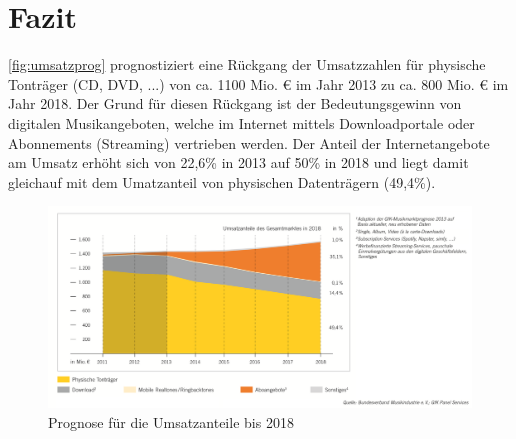 \section{Fazit}
\label{sec:schluss}

\autoref{fig:umsatzprog} prognostiziert eine Rückgang der Umsatzzahlen für
physische Tonträger (CD, DVD, ...) von ca. 1100 Mio. \euro{} im Jahr 2013 zu ca.
800 Mio. \euro{} im Jahr 2018. Der Grund für diesen Rückgang ist der
Bedeutungsgewinn von digitalen Musikangeboten, welche im Internet mittels
Downloadportale oder Abon­ne­ments (Streaming) vertrieben werden. Der Anteil der
Internetangebote am Umsatz erhöht sich von 22,6\% in 2013 auf 50\% in 2018 und
liegt damit gleichauf mit dem Umatzanteil von physischen Datenträgern (49,4\%).

\begin{figure}[h]
    \begin{center}
        \begin{minipage}[t]{\textwidth}
            \begin{center}
                \includegraphics[width=\textwidth]{Bilder/Schluss/prognose.png}
                \caption[Prognose für die Umsatzanteile bis 2018 \newline \url{http://www.musikindustrie.de/uploads/media/140325\_BVMI\_2013\_Jahrbuch\_ePaper\_V02.pdf} S.15 (zuletzt aufgerufen am 03.08.2015)]{Prognose für die Umsatzanteile bis 2018}
                \label{fig:umsatzprog}
            \end{center}
        \end{minipage}
    \end{center}
\end{figure}


